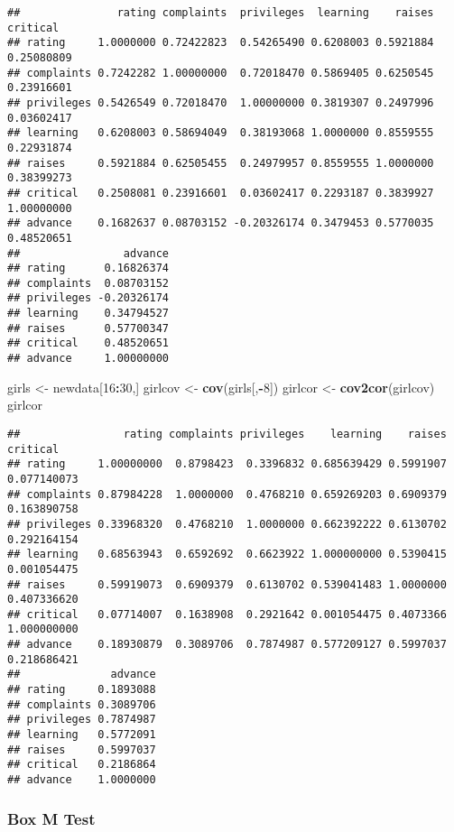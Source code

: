 \documentclass[]{article}
\newenvironment{Shaded}{\begin{snugshade}}{\end{snugshade}}
\newcommand{\KeywordTok}[1]{\textcolor[rgb]{0.13,0.29,0.53}{\textbf{#1}}}
\newcommand{\DecValTok}[1]{\textcolor[rgb]{0.00,0.00,0.81}{#1}}
\newcommand{\StringTok}[1]{\textcolor[rgb]{0.31,0.60,0.02}{#1}}
\newcommand{\OperatorTok}[1]{\textcolor[rgb]{0.81,0.36,0.00}{\textbf{#1}}}
\newcommand{\NormalTok}[1]{#1}
\begin{document}
\begin{verbatim}
##               rating complaints  privileges  learning    raises   critical
## rating     1.0000000 0.72422823  0.54265490 0.6208003 0.5921884 0.25080809
## complaints 0.7242282 1.00000000  0.72018470 0.5869405 0.6250545 0.23916601
## privileges 0.5426549 0.72018470  1.00000000 0.3819307 0.2497996 0.03602417
## learning   0.6208003 0.58694049  0.38193068 1.0000000 0.8559555 0.22931874
## raises     0.5921884 0.62505455  0.24979957 0.8559555 1.0000000 0.38399273
## critical   0.2508081 0.23916601  0.03602417 0.2293187 0.3839927 1.00000000
## advance    0.1682637 0.08703152 -0.20326174 0.3479453 0.5770035 0.48520651
##                advance
## rating      0.16826374
## complaints  0.08703152
## privileges -0.20326174
## learning    0.34794527
## raises      0.57700347
## critical    0.48520651
## advance     1.00000000
\end{verbatim}

\begin{Shaded}
\begin{Highlighting}[]
\NormalTok{girls <-}\StringTok{ }\NormalTok{newdata[}\DecValTok{16}\OperatorTok{:}\DecValTok{30}\NormalTok{,]}
\NormalTok{girlcov <-}\StringTok{ }\KeywordTok{cov}\NormalTok{(girls[,}\OperatorTok{-}\DecValTok{8}\NormalTok{])}
\NormalTok{girlcor <-}\StringTok{ }\KeywordTok{cov2cor}\NormalTok{(girlcov)}
\NormalTok{girlcor}
\end{Highlighting}
\end{Shaded}

\begin{verbatim}
##                rating complaints privileges    learning    raises    critical
## rating     1.00000000  0.8798423  0.3396832 0.685639429 0.5991907 0.077140073
## complaints 0.87984228  1.0000000  0.4768210 0.659269203 0.6909379 0.163890758
## privileges 0.33968320  0.4768210  1.0000000 0.662392222 0.6130702 0.292164154
## learning   0.68563943  0.6592692  0.6623922 1.000000000 0.5390415 0.001054475
## raises     0.59919073  0.6909379  0.6130702 0.539041483 1.0000000 0.407336620
## critical   0.07714007  0.1638908  0.2921642 0.001054475 0.4073366 1.000000000
## advance    0.18930879  0.3089706  0.7874987 0.577209127 0.5997037 0.218686421
##              advance
## rating     0.1893088
## complaints 0.3089706
## privileges 0.7874987
## learning   0.5772091
## raises     0.5997037
## critical   0.2186864
## advance    1.0000000
\end{verbatim}

\subsubsection{Box M Test}\label{box-m-test}
\end{document}
